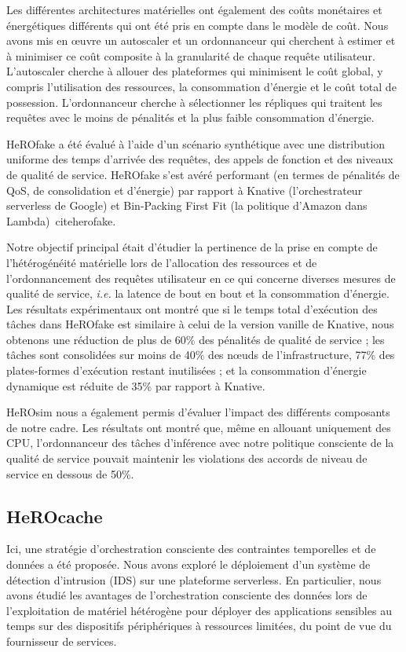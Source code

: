 Les différentes architectures matérielles ont également des coûts monétaires et énergétiques différents qui ont été pris en compte dans le modèle de coût. Nous avons mis en œuvre un autoscaler et un ordonnanceur qui cherchent à estimer et à minimiser ce coût composite à la granularité de chaque requête utilisateur. L'autoscaler cherche à allouer des plateformes qui minimisent le coût global, y compris l'utilisation des ressources, la consommation d'énergie et le coût total de possession. L'ordonnanceur cherche à sélectionner les répliques qui traitent les requêtes avec le moins de pénalités et la plus faible consommation d'énergie.

HeROfake a été évalué à l'aide d'un scénario synthétique avec une distribution uniforme des temps d'arrivée des requêtes, des appels de fonction et des niveaux de qualité de service. HeROfake s'est avéré performant (en termes de pénalités de QoS, de consolidation et d'énergie) par rapport à Knative (l'orchestrateur serverless de Google) et Bin-Packing First Fit (la politique d'Amazon dans Lambda)~cite{herofake}. 

Notre objectif principal était d'étudier la pertinence de la prise en compte de l'hétérogénéité matérielle lors de l'allocation des ressources et de l'ordonnancement des requêtes utilisateur en ce qui concerne diverses mesures de qualité de service, \textit{i.e.} la latence de bout en bout et la consommation d'énergie. Les résultats expérimentaux ont montré que si le temps total d'exécution des tâches dans HeROfake est similaire à celui de la version vanille de Knative, nous obtenons une réduction de plus de 60\% des pénalités de qualité de service ; les tâches sont consolidées sur moins de 40\% des nœuds de l'infrastructure, 77\% des plates-formes d'exécution restant inutilisées ; et la consommation d'énergie dynamique est réduite de 35\% par rapport à Knative.

HeROsim nous a également permis d'évaluer l'impact des différents composants de notre cadre. Les résultats ont montré que, même en allouant uniquement des CPU, l'ordonnanceur des tâches d'inférence avec notre politique consciente de la qualité de service pouvait maintenir les violations des accords de niveau de service en dessous de 50\%. 

\subsection{HeROcache}

Ici, une stratégie d'orchestration consciente des contraintes temporelles et de données a été proposée. Nous avons exploré le déploiement d'un système de détection d'intrusion (IDS) sur une plateforme serverless. En particulier, nous avons étudié les avantages de l'orchestration consciente des données lors de l'exploitation de matériel hétérogène pour déployer des applications sensibles au temps sur des dispositifs périphériques à ressources limitées, du point de vue du fournisseur de services.


